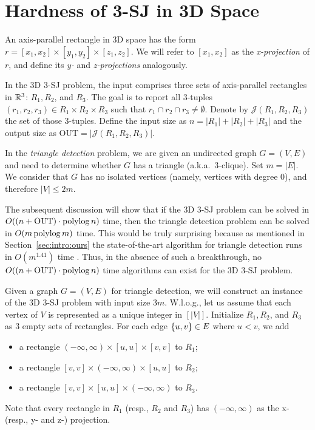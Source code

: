 \documentclass[acmsmall,review,anonymous]{acmart}
\def\vgap{\vspace{1mm}}
\def\J{\mathcal{J}}
\def\out{\mathrm{OUT}}
\begin{document}
{{{\section{Hardness of 3-SJ in 3D Space} \label{app:lb-cond}

An axis-parallel rectangle in 3D space has the form $r = [x_1, x_2] \times [y_1, y_2] \times [z_1, z_2]$. We will refer to $[x_1, x_2]$ as the {\em x-projection} of $r$, and define its {\em y-} and {\em z-projections} analogously.


\vgap

In the 3D 3-SJ problem, the input comprises three sets of axis-parallel rectangles in $\mathbb{R}^3$: $R_1, R_2$, and $R_3$. The goal is to report all 3-tuples $(r_1, r_2, r_3) \in R_1 \times R_2 \times R_3$ such that $r_1 \cap r_2 \cap r_3 \neq \emptyset$. Denote by $\J(R_1, R_2, R_3)$ the set of those 3-tuples. Define the input size as $n = |R_1| + |R_2| + |R_3|$ and the output size as $\out = |\J(R_1, R_2, R_3)|$.

\vgap

In the {\em triangle detection} problem, we are given an undirected graph $G = (V, E)$ and need to determine whether $G$ has a triangle (a.k.a.\, 3-clique). Set $m = |E|$. We consider that $G$ has no isolated vertices (namely, vertices with degree 0), and therefore $|V| \le 2m$.

\vgap

The subsequent discussion will show that if the 3D 3-SJ problem can be solved in $O((n + \out) \cdot \polylog n)$ time, then the triangle detection problem can be solved in $O(m \operatorname*{polylog} m)$ time. This would be truly surprising because as mentioned in Section~\ref{sec:intro:ours} the state-of-the-art algorithm for triangle detection runs in $O(m^{1.41})$ time \cite{ayz97}. Thus, in the absence of such a breakthrough, no $O((n + \out) \cdot \polylog n)$ time algorithms can exist for the 3D 3-SJ problem.

\vgap

Given a graph $G = (V,E)$ for triangle detection, we will construct an instance of the 3D 3-SJ problem with input size $3m$. W.l.o.g., let us assume that each vertex of $V$ is represented as a unique integer in $[|V|]$. Initialize $R_1, R_2$, and $R_3$ as 3 empty sets of rectangles. For each edge $\{u, v\}\in E$ where $u < v$, we add
\begin{itemize}
    \item a rectangle $(-\infty, \infty) \times [u,u] \times [v,v]$ to $R_1$;
    \item a rectangle $[v,v] \times(-\infty, \infty)\times [u,u]$ to $R_2$;
    \item a rectangle $[v,v] \times [u,u] \times(-\infty, \infty) $ to $R_3$.
\end{itemize}
Note that every rectangle in $R_1$ (resp., $R_2$ and $R_3$) has $(-\infty, \infty)$ as the x- (resp., y- and z-) projection.

}}}
\end{document}
